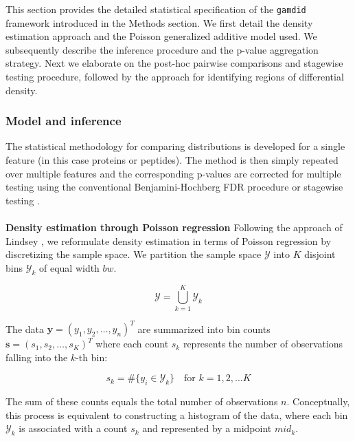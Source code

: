 \renewcommand{\theequation}{S\arabic{equation}}
\setcounter{equation}{0}

This section provides the detailed statistical specification of the \texttt{gamdid} framework introduced in the Methods section. We first detail the density estimation approach and the Poisson generalized additive model used. We subsequently describe the inference procedure and the p-value aggregation strategy. Next we elaborate on the post-hoc pairwise comparisons and stagewise testing procedure, followed by the approach for identifying regions of differential density.

\subsubsection{Model and inference}

The statistical methodology for comparing distributions is developed for a single feature (in this case proteins or peptides). The method is then simply repeated over multiple features and the corresponding p-values are corrected for multiple testing using the conventional Benjamini-Hochberg FDR procedure \cite{BH_procedure} or stagewise testing \cite{stagewise_testing}.
\\
\\
\textbf{Density estimation through Poisson regression} Following the approach of Lindsey \cite{lindsay_method}, we reformulate density estimation in terms of Poisson regression by discretizing the sample space. We partition the sample space $\mathscr{Y}$ into $K$ disjoint bins $\mathscr{Y}_k$ of equal width $bw$.

\begin{equation}
	\mathscr{Y} =\bigcup_{k=1}^K \mathscr{Y}_k
	\label{eq:discr}
\end{equation}

The data $\boldsymbol{y} = (y_1, y_2, \ldots, y_n)^T$ are summarized into bin counts $\boldsymbol{s} = (s_1, s_2, \ldots, s_K)^T$ where each count $s_k$ represents the number of observations falling into the $k$-th bin:

\begin{equation}
    s_k = \# \{ y_i \in \mathscr{Y}_k \}\quad
    \text{for } k=1,2, \ldots K
	\label{eq:binning}
\end{equation}

The sum of these counts equals the total number of observations $n$. Conceptually, this process is equivalent to constructing a histogram of the data, where each bin $\mathscr{Y}_k$ is associated with a count $s_k$ and represented by a midpoint $mid_k$.

